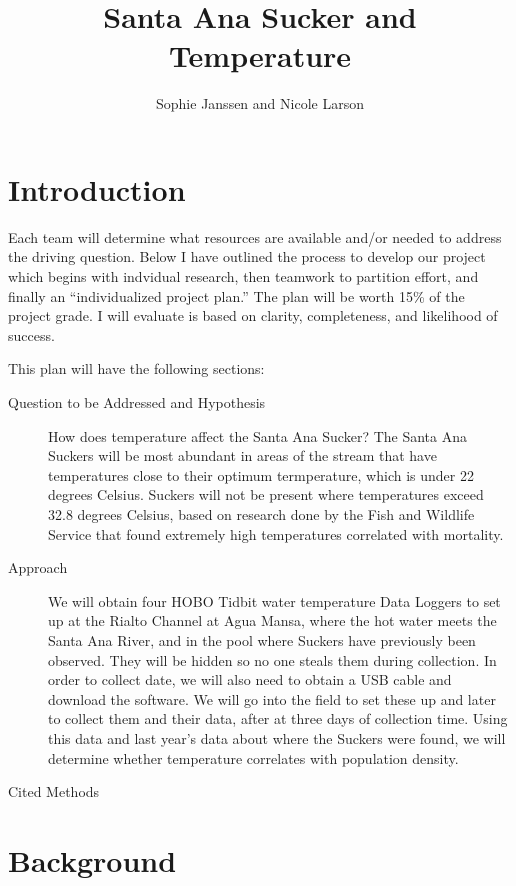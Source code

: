 \documentclass{tufte-handout}
\title{Santa Ana Sucker and Temperature}
\author{Sophie Janssen and Nicole Larson}
\begin{document}


\maketitle

\section{Introduction}

Each team will determine what resources are available and/or needed to address the driving question. Below I have outlined the process to develop our project which begins with indvidual research, then teamwork to partition effort, and finally an ``individualized project plan.'' The plan will be worth 15\% of the project grade. I will evaluate is based on clarity, completeness, and likelihood of success. 

This plan will have the following sections: 

\begin{description}
  \item[Question to be Addressed and Hypothesis] How does temperature affect the Santa Ana Sucker? The Santa Ana Suckers will be most abundant in areas of the stream that have temperatures close to their optimum termperature, which is under 22 degrees Celsius. Suckers will not be present where temperatures exceed 32.8 degrees Celsius, based on research done by the Fish and Wildlife Service that found extremely high temperatures correlated with mortality.
  \item[Approach] We will obtain four HOBO Tidbit water temperature Data Loggers to set up at the Rialto Channel at Agua Mansa, where the hot water meets the Santa Ana River, and in the pool where Suckers have previously been observed. They will be hidden so no one steals them during collection. In order to collect date, we will also need to obtain a USB cable and download the software. We will go into the field to set these up and later to collect them and their data, after at three days of collection time. Using this data and last year's data about where the Suckers were found, we will determine whether temperature correlates with population density.
  \item[Cited Methods] 
  
 \end{description} 
\section{Background}
\end{document}
